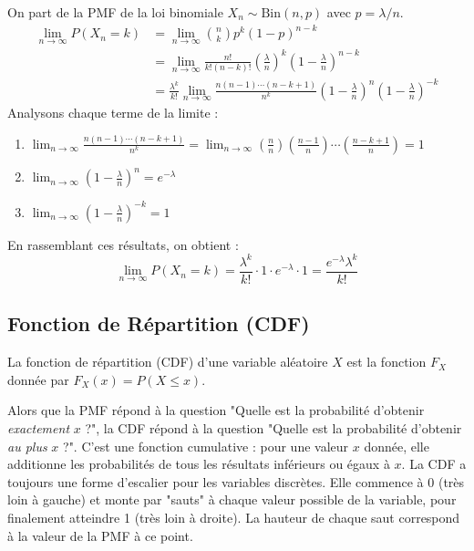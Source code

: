 \begin{proofbox}
On part de la PMF de la loi binomiale $X_n \sim \text{Bin}(n, p)$ avec $p=\lambda/n$.
\begin{align*}
\lim_{n \to \infty} P(X_n=k) &= \lim_{n \to \infty} \binom{n}{k} p^k (1-p)^{n-k} \\
&= \lim_{n \to \infty} \frac{n!}{k!(n-k)!} \left(\frac{\lambda}{n}\right)^k \left(1-\frac{\lambda}{n}\right)^{n-k} \\
&= \frac{\lambda^k}{k!} \lim_{n \to \infty} \frac{n(n-1)\cdots(n-k+1)}{n^k} \left(1-\frac{\lambda}{n}\right)^n \left(1-\frac{\lambda}{n}\right)^{-k}
\end{align*}
Analysons chaque terme de la limite :
\begin{enumerate}
    \item $\displaystyle \lim_{n \to \infty} \frac{n(n-1)\cdots(n-k+1)}{n^k} = \lim_{n \to \infty} \left(\frac{n}{n}\right)\left(\frac{n-1}{n}\right)\cdots\left(\frac{n-k+1}{n}\right) = 1$
    \item $\displaystyle \lim_{n \to \infty} \left(1-\frac{\lambda}{n}\right)^n = e^{-\lambda}$
    \item $\displaystyle \lim_{n \to \infty} \left(1-\frac{\lambda}{n}\right)^{-k} = 1$
\end{enumerate}
En rassemblant ces résultats, on obtient :
$$ \lim_{n \to \infty} P(X_n=k) = \frac{\lambda^k}{k!} \cdot 1 \cdot e^{-\lambda} \cdot 1 = \frac{e^{-\lambda}\lambda^k}{k!} $$
\end{proofbox}


\subsection{Fonction de Répartition (CDF)}

\begin{definitionbox}
La fonction de répartition (CDF) d'une variable aléatoire $X$ est la fonction $F_X$ donnée par $F_X(x) = P(X \le x)$.
\end{definitionbox}

\begin{intuitionbox}
Alors que la PMF répond à la question "Quelle est la probabilité d'obtenir \textit{exactement} $x$ ?", la CDF répond à la question "Quelle est la probabilité d'obtenir \textit{au plus} $x$ ?". C'est une fonction cumulative : pour une valeur $x$ donnée, elle additionne les probabilités de tous les résultats inférieurs ou égaux à $x$.
La CDF a toujours une forme d'escalier pour les variables discrètes. Elle commence à 0 (très loin à gauche) et monte par "sauts" à chaque valeur possible de la variable, pour finalement atteindre 1 (très loin à droite). La hauteur de chaque saut correspond à la valeur de la PMF à ce point.
\end{intuitionbox}

